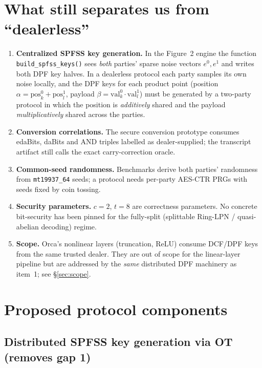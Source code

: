 \documentclass[11pt]{article}
\begin{document}
\section{What still separates us from ``dealerless''}
\label{sec:gaps}

\begin{enumerate}[leftmargin=2em]
\item \textbf{Centralized SPFSS key generation.} In the Figure~2 engine the
  function \texttt{build\_spfss\_keys()} sees \emph{both} parties' sparse
  noise vectors $e^0, e^1$ and writes both DPF key halves. In a dealerless
  protocol each party samples its own noise locally, and the DPF keys for each
  product point (position $\alpha = \mathrm{pos}^0_k + \mathrm{pos}^1_l$,
  payload $\beta = \mathrm{val}^0_k \cdot \mathrm{val}^1_l$) must be generated
  by a two-party protocol in which the position is \emph{additively} shared
  and the payload \emph{multiplicatively} shared across the parties.
\item \textbf{Conversion correlations.} The secure conversion prototype
  consumes edaBits, daBits and AND triples labelled as dealer-supplied; the
  transcript artifact still calls the exact carry-correction oracle.
\item \textbf{Common-seed randomness.} Benchmarks derive both parties'
  randomness from \texttt{mt19937\_64} seeds; a protocol needs per-party
  AES-CTR PRGs with seeds fixed by coin tossing.
\item \textbf{Security parameters.} $c{=}2$, $t{=}8$ are correctness
  parameters. No concrete bit-security has been pinned for the fully-split
  (splittable Ring-LPN / quasi-abelian decoding) regime.
\item \textbf{Scope.} Orca's nonlinear layers (truncation, ReLU) consume
  DCF/DPF keys from the same trusted dealer. They are out of scope for the
  linear-layer pipeline but are addressed by the \emph{same} distributed DPF
  machinery as item~1; see \S\ref{sec:scope}.
\end{enumerate}

\section{Proposed protocol components}
\label{sec:proposal}

\subsection{Distributed SPFSS key generation via OT (removes gap 1)}
\label{sec:dpf}
\end{document}
